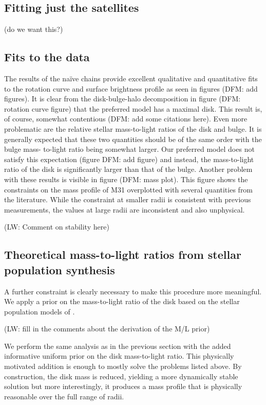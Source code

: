 \documentclass[preprint]{aastex}
\begin{document}
\subsection{Fitting just the satellites}

(do we want this?)

\subsection{Fits to the data}

The results of the na\"ive chains provide excellent qualitative and
quantitative fits to the rotation curve and surface brightness profile
as seen in figures (DFM: add figures). It is clear from the disk-bulge-halo
decomposition in figure (DFM: rotation curve figure) that the preferred
model has a maximal disk. This result is, of course, somewhat contentious
(DFM: add some citations here). Even more problematic are the relative
stellar mass-to-light ratios of the disk and bulge. It is generally expected
that these two quantities should be of the same order with the bulge mass-
to-light ratio being somewhat larger. Our preferred model does not satisfy
this expectation (figure DFM: add figure) and instead, the mass-to-light
ratio of the disk is significantly larger than that of the bulge. Another
problem with these results is visible in figure (DFM: mass plot). This
figure shows the constraints on the mass profile of M31 overplotted with
several quantities from the literature. While the constraint at smaller
radii is consistent with previous measurements, the values at large radii
are inconsistent and also unphysical.

(LW: Comment on stability here)


\subsection{Theoretical mass-to-light ratios from stellar population
    synthesis}

A further constraint is clearly necessary to make this procedure more
meaningful. We apply a prior on the mass-to-light ratio of the disk based
on the stellar population models of \citet{Bell:2003}.

(LW: fill in the comments about the derivation of the M/L prior)

We perform the same analysis as in the previous section with the added
informative uniform prior on the disk mass-to-light ratio. This physically
motivated addition is enough to mostly solve the problems listed above. By
construction, the disk mass is reduced, yielding a more dynamically stable
solution but more interestingly, it produces a mass profile that is physically
reasonable over the full range of radii.
\end{document}
